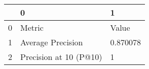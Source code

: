 \begin{tabular}{lll}
\toprule
{} &                       0 &         1 \\
\midrule
0 &                  Metric &     Value \\
1 &       Average Precision &  0.870078 \\
2 &  Precision at 10 (P@10) &         1 \\
\bottomrule
\end{tabular}
